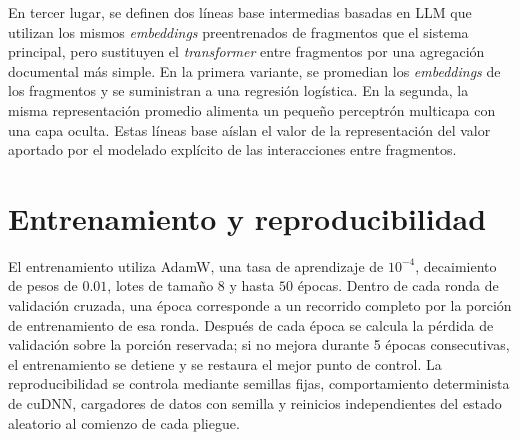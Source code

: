 En tercer lugar, se definen dos líneas base intermedias basadas en LLM que utilizan los mismos \textit{embeddings} preentrenados de fragmentos que el sistema principal, pero sustituyen el \textit{transformer} entre fragmentos por una agregación documental más simple. En la primera variante, se promedian los \textit{embeddings} de los fragmentos y se suministran a una regresión logística. En la segunda, la misma representación promedio alimenta un pequeño perceptrón multicapa con una capa oculta. Estas líneas base aíslan el valor de la representación del valor aportado por el modelado explícito de las interacciones entre fragmentos.

\section{Entrenamiento y reproducibilidad}
El entrenamiento utiliza AdamW, una tasa de aprendizaje de $10^{-4}$, decaimiento de pesos de $0.01$, lotes de tamaño $8$ y hasta $50$ épocas. Dentro de cada ronda de validación cruzada, una época corresponde a un recorrido completo por la porción de entrenamiento de esa ronda. Después de cada época se calcula la pérdida de validación sobre la porción reservada; si no mejora durante 5 épocas consecutivas, el entrenamiento se detiene y se restaura el mejor punto de control. La reproducibilidad se controla mediante semillas fijas, comportamiento determinista de cuDNN, cargadores de datos con semilla y reinicios independientes del estado aleatorio al comienzo de cada pliegue.
